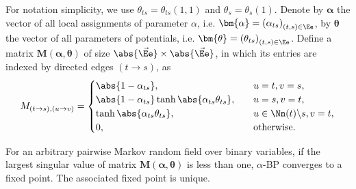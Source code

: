 For notation simplicity, we use $\theta_{ts}=\theta_{ts}(1, 1)$ and $\theta_s = \theta_s(1)$. Denote by $\bm{\alpha}$ the vector of all local assignments of parameter $\alpha$, i.e. $\bm{\alpha} = \left(  \alpha_{ts} \right)_{(t ,s) \in \Ee }$, by $\bm{\theta}$ the vector of all parameters of potentials, i.e. $\bm{\theta} = \left(  \theta_{ts} \right)_{(t ,s) \in \Ee }$.  Define a matrix $\bm{M}(\bm{\alpha}, \bm{\theta})$ of size $\abs{\vec{\Ee}} \times \abs{\vec{\Ee}}$, in which its entries are indexed by directed edges $(t\rightarrow s)$, as
\begin{align}\label{eq:matrix_m}
  M_{(t\rightarrow s), (u \rightarrow v)} =
  \begin{cases}
    \abs{ 1 - \alpha_{ts}}, &\quad u=t, v=s, \\
    \abs{ 1 - \alpha_{ts}} \tanh \abs{\alpha_{ts} \theta_{ts}}, & \quad u = s, v =t, \\
    \tanh\abs{\alpha_{ts} \theta_{ts}}, & \quad u \in \Nn(t)\backslash s, v = t, \\
    0, & \quad \mathrm{otherwise}.
  \end{cases}
\end{align}
\begin{theorem}\label{thm:normd}
  For an arbitrary pairwise Markov random field over binary variables,
  if the largest singular value of matrix $\bm{M}(\bm{\alpha}, \bm{\theta})$ is less than one,
  $\alpha$-BP converges to a fixed point. The associated fixed point is unique.
\end{theorem}

